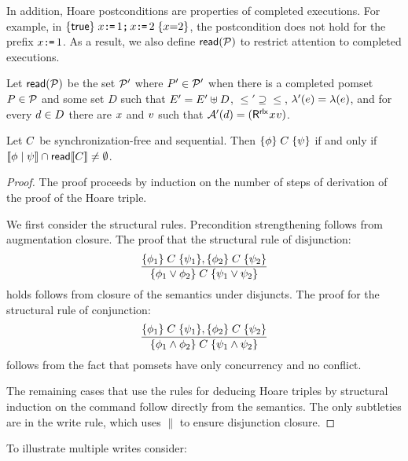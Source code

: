 In addition, Hoare postconditions are properties of completed executions.
For example, in $\{\mathsf{true}\}\allowbreak\;x\texttt{:}\mkern-1mu\texttt{=}\,1\texttt{;}\,\allowbreak x\texttt{:}\mkern-1mu\texttt{=}\,2\;\allowbreak\{x{=}2\}$, the postcondition
does not hold for the prefix $x\texttt{:}\mkern-1mu\texttt{=}\,1$.  As a result, we also define
${\mathsf{read}}(\mathcal{P})$ to restrict attention to completed executions.  %


Let ${\mathsf{read}}(\mathcal{P})$ be the set $\mathcal{P}'$ where $P'\in\mathcal{P}'$ when there is
a completed pomset $P\in\mathcal{P}$ and some set $D$ such that
$E'= E'\uplus D$, ${\le'} \supseteq{\le}$,
$\lambda'(e) = \lambda(e)$, and for every $d\in D$ there are
$x$ and $v$ such that
$\labelingAct'(\bEv)=(\DR[\modeRLX]{\aLoc}{\aVal})$.

\begin{theorem}
  \label{thm:hoare}
  Let $C$ be synchronization-free and sequential.  Then
  $\{\phi\}\allowbreak\;C\;\allowbreak\{\psi\}$ if and only if
  $\llbracket\phi\mid\psi\rrbracket\cap\mathsf{read}\llbracket C\rrbracket\neq\emptyset$.
\begin{proof}
  The proof proceeds by induction on the number of steps of derivation of the
  proof of the Hoare triple.

  We first consider the structural rules.  Precondition strengthening follows
  from augmentation closure.  The proof that the structural rule of
  disjunction:
  \begin{displaymath}
    \frac{\{\phi_1\}\allowbreak\;C\;\allowbreak\{\psi_1\},  \{\phi_2\}\allowbreak\;C\;\allowbreak\{\psi_2\}}{ \{\phi_1 \lor \phi_2\}\allowbreak\;C\;\allowbreak\{\psi_1\lor \psi_2\}} 
  \end{displaymath}
  holds  follows from closure of the semantics under disjuncts. The proof for the structural rule of conjunction:
  \begin{displaymath}
    \frac{\{\phi_1\}\allowbreak\;C\;\allowbreak\{\psi_1\},  \{\phi_2\}\allowbreak\;C\;\allowbreak\{\psi_2\}}{ \{\phi_1 \land \phi_2\}\allowbreak\;C\;\allowbreak\{\psi_1\land \psi_2\}} 
  \end{displaymath}
  follows from the fact that pomsets have only concurrency and no conflict.  

  The remaining cases that use the rules for deducing Hoare triples by
  structural induction on the command follow directly from the semantics.
  The only subtleties are in the write rule, which uses $\parallel$ to ensure
  disjunction closure.
\end{proof}
\end{theorem}
To illustrate multiple writes consider:
